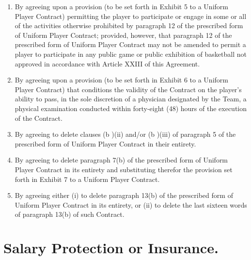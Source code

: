 \documentclass[
]{book}
\begin{document}
\begin{enumerate}
\item
  By agreeing upon a provision (to be set forth in Exhibit 5 to a Uniform Player Contract) permitting the player to participate or engage in some or all of the activities otherwise prohibited by paragraph 12 of the prescribed form of Uniform Player Contract; provided, however, that paragraph 12 of the prescribed form of Uniform Player Contract may not be amended to permit a player to participate in any public game or public exhibition of basketball not approved in accordance with Article XXIII of this Agreement.
\item
  By agreeing upon a provision (to be set forth in Exhibit 6 to a Uniform Player Contract) that conditions the validity of the Contract on the player's ability to pass, in the sole discretion of a physician designated by the Team, a physical examination conducted within forty-eight (48) hours of the execution of the Contract.
\item
  By agreeing to delete clauses (b )(ii) and/or (b )(iii) of paragraph 5 of the prescribed form of Uniform Player Contract in their entirety.
\item
  By agreeing to delete paragraph 7(b) of the prescribed form of Uniform Player Contract in its entirety and substituting therefor the provision set forth in Exhibit 7 to a Uniform Player Contract.
\item
  By agreeing either (i) to delete paragraph 13(b) of the prescribed form of Uniform Player Contract in its entirety, or (ii) to delete the last sixteen words of paragraph 13(b) of such Contract.
\end{enumerate}

\hypertarget{salary-protection-or-insurance.}{%
\section{Salary Protection or Insurance.}\label{salary-protection-or-insurance.}}
\end{document}
